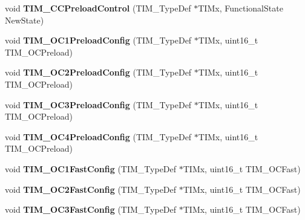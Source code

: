\begin{DoxyCompactItemize}
\item 
\hypertarget{group__TIM__Exported__Functions_ga0a935254e44312b1d78e8684a58db3c1}{
void {\bfseries TIM\_\-CCPreloadControl} (TIM\_\-TypeDef $\ast$TIMx, FunctionalState NewState)}
\label{group__TIM__Exported__Functions_ga0a935254e44312b1d78e8684a58db3c1}

\item 
\hypertarget{group__TIM__Exported__Functions_ga60e6c29ad8f919bef616cf8e3306dd64}{
void {\bfseries TIM\_\-OC1PreloadConfig} (TIM\_\-TypeDef $\ast$TIMx, uint16\_\-t TIM\_\-OCPreload)}
\label{group__TIM__Exported__Functions_ga60e6c29ad8f919bef616cf8e3306dd64}

\item 
\hypertarget{group__TIM__Exported__Functions_ga75b4614c6dd2cd52f2c5becdb6590c10}{
void {\bfseries TIM\_\-OC2PreloadConfig} (TIM\_\-TypeDef $\ast$TIMx, uint16\_\-t TIM\_\-OCPreload)}
\label{group__TIM__Exported__Functions_ga75b4614c6dd2cd52f2c5becdb6590c10}

\item 
\hypertarget{group__TIM__Exported__Functions_ga8b2391685a519e60e596b7d596f86f09}{
void {\bfseries TIM\_\-OC3PreloadConfig} (TIM\_\-TypeDef $\ast$TIMx, uint16\_\-t TIM\_\-OCPreload)}
\label{group__TIM__Exported__Functions_ga8b2391685a519e60e596b7d596f86f09}

\item 
\hypertarget{group__TIM__Exported__Functions_ga8bf4dfb35ff0c7b494dd96579f50b1ec}{
void {\bfseries TIM\_\-OC4PreloadConfig} (TIM\_\-TypeDef $\ast$TIMx, uint16\_\-t TIM\_\-OCPreload)}
\label{group__TIM__Exported__Functions_ga8bf4dfb35ff0c7b494dd96579f50b1ec}

\item 
\hypertarget{group__TIM__Exported__Functions_gaec82031ca62f31f5483195c09752a83a}{
void {\bfseries TIM\_\-OC1FastConfig} (TIM\_\-TypeDef $\ast$TIMx, uint16\_\-t TIM\_\-OCFast)}
\label{group__TIM__Exported__Functions_gaec82031ca62f31f5483195c09752a83a}

\item 
\hypertarget{group__TIM__Exported__Functions_ga413359c87f46c69f1ffe2dc8fb3a65e7}{
void {\bfseries TIM\_\-OC2FastConfig} (TIM\_\-TypeDef $\ast$TIMx, uint16\_\-t TIM\_\-OCFast)}
\label{group__TIM__Exported__Functions_ga413359c87f46c69f1ffe2dc8fb3a65e7}

\item 
\hypertarget{group__TIM__Exported__Functions_gab2f3698e6e56bd9b0a4be7056ba789e1}{
void {\bfseries TIM\_\-OC3FastConfig} (TIM\_\-TypeDef $\ast$TIMx, uint16\_\-t TIM\_\-OCFast)}
\label{group__TIM__Exported__Functions_gab2f3698e6e56bd9b0a4be7056ba789e1}


\end{DoxyCompactItemize}
